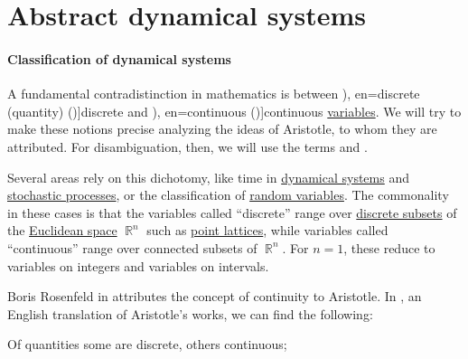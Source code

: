 \section{Abstract dynamical systems}\label{sec:abstract_dynamical_systems}

\paragraph{Classification of dynamical systems}

\begin{concept}\label{con:discrete_and_continuous_variables}
  A fundamental contradistinction in mathematics is between \term[ru=дискретная (величина) (\cite[16]{АлександровМаркушевичХинчинИПр1963ЭнциклопедияТом4}), en=discrete (quantity) ({\cite[\enquote{Categories}, page 36]{BarnesEtAl1984AristotleCompleteWorks})}]{discrete} and \term[ru=непрерывная (величина) (\cite[16]{АлександровМаркушевичХинчинИПр1963ЭнциклопедияТом4}), en=continuous ({\cite[\enquote{Categories}, page 36]{BarnesEtAl1984AristotleCompleteWorks}})]{continuous} \hyperref[con:variable]{variables}. We will try to make these notions precise analyzing the ideas of Aristotle, to whom they are attributed. For disambiguation, then, we will use the terms  and .

  Several areas rely on this dichotomy, like time in \hyperref[def:dynamical_system]{dynamical systems} and \hyperref[def:stochastic_process]{stochastic processes}, or the classification of \hyperref[def:random_variable]{random variables}. The commonality in these cases is that the variables called \enquote{discrete} range over \hyperref[def:discrete_set]{discrete subsets} of the \hyperref[def:euclidean_plane]{Euclidean space} \( \BbbR^n \) such as \hyperref[def:point_lattice]{point lattices}, while variables called \enquote{continuous} range over connected subsets of \( \BbbR^n \). For \( n = 1 \), these reduce to variables on integers and variables on intervals.

  Boris Rosenfeld in \cite[17]{АлександровМаркушевичХинчинИПр1963ЭнциклопедияТом4} attributes the concept of continuity to Aristotle. In \cite[\enquote{Categories}, page 36]{BarnesEtAl1984AristotleCompleteWorks}, an English translation of Aristotle's works, we can find the following:
  \begin{displayquote}
    Of quantities some are discrete, others continuous; \textellipsis


\end{displayquote}
\end{concept}
